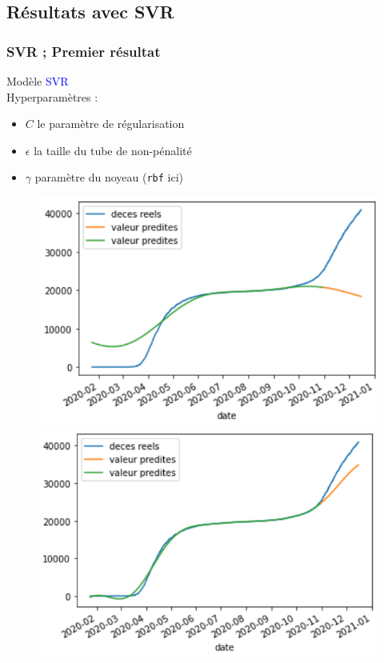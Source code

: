 \documentclass{beamer}[aspectratio = 43]
\begin{document}
\subsection*{Résultats avec SVR}
\begin{frame}
	\frametitle{SVR ; Premier résultat}
	Modèle \textcolor{blue}{SVR}%
	\\
	Hyperparamètres :
	\begin{itemize}
		\item[]$C$ le paramètre de régularisation
		\item[]$\epsilon$ la taille du tube de \og non-pénalité \fg
		\item[]$\gamma$ paramètre du noyeau (\texttt{rbf} ici)
	\end{itemize}
	\begin{figure}[h]
		\centering
		\begin{minipage}{0.5\textwidth}
			\includegraphics[scale=0.4]{svr100_}
		\end{minipage}%
		\begin{minipage}{0.5\textwidth}
			\includegraphics[scale=0.4]{svr100000_}

\end{minipage}
\end{figure}
\end{frame}
\end{document}
